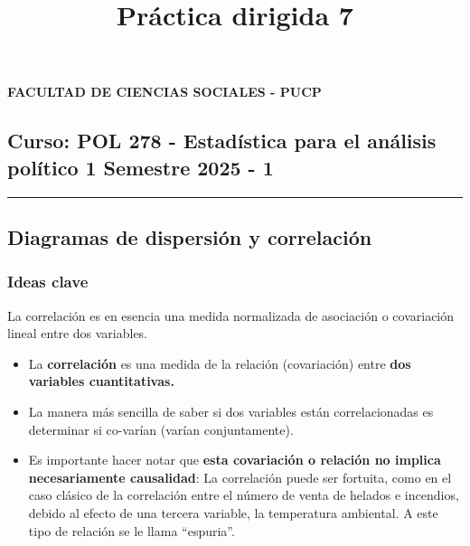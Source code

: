 \documentclass[
]{article}
\title{Práctica dirigida 7}
\author{}
\date{\vspace{-2.5em}}
\begin{document}
\maketitle

{
\setcounter{tocdepth}{2}
\tableofcontents
}
\textbf{FACULTAD DE CIENCIAS SOCIALES - PUCP}

\hypertarget{curso-pol-278---estaduxedstica-para-el-anuxe1lisis-poluxedtico-1-semestre-2025---1}{%
\subsection{\texorpdfstring{Curso: POL 278 - Estadística para el
análisis político 1 \textbar{} Semestre 2025 - 1
}{Curso: POL 278 - Estadística para el análisis político 1 \textbar{} Semestre 2025 - 1  }}\label{curso-pol-278---estaduxedstica-para-el-anuxe1lisis-poluxedtico-1-semestre-2025---1}}

\begin{center}\rule{0.5\linewidth}{0.5pt}\end{center}

\hypertarget{diagramas-de-dispersiuxf3n-y-correlaciuxf3n}{%
\subsection{\texorpdfstring{\textbf{Diagramas de dispersión y
correlación}}{Diagramas de dispersión y correlación}}\label{diagramas-de-dispersiuxf3n-y-correlaciuxf3n}}

\hypertarget{ideas-clave}{%
\subsubsection{Ideas clave}\label{ideas-clave}}

La correlación es en esencia una medida normalizada de asociación o
covariación lineal entre dos variables.

\begin{itemize}
\item
  La \textbf{correlación} es una medida de la relación (covariación)
  entre \textbf{dos variables cuantitativas.}
\item
  La manera más sencilla de saber si dos variables están correlacionadas
  es determinar si co-varían (varían conjuntamente).
\item
  Es importante hacer notar que \textbf{esta covariación o relación no
  implica necesariamente causalidad}: La correlación puede ser fortuita,
  como en el caso clásico de la correlación entre el número de venta de
  helados e incendios, debido al efecto de una tercera variable, la
  temperatura ambiental. A este tipo de relación se le llama
  ``espuria''.
\end{itemize}
\end{document}
